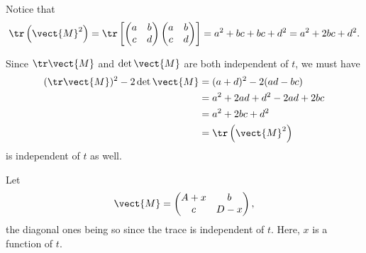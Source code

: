 \begin{enumerate}
          Notice that
          \[
              \tr \left(\vect{M}^2\right) = \tr \left[\begin{pmatrix}
                      a & b \\ c & d
                  \end{pmatrix}\begin{pmatrix}
                      a & b \\ c & d
                  \end{pmatrix}\right] = a^2 + bc + bc + d^2 = a^2 + 2bc + d^2.
          \]

          Since \(\tr \vect{M}\) and \(\det \vect{M}\) are both independent of \(t\), we must have
          \begin{align*}
              (\tr \vect{M})^2 - 2 \det \vect{M} & = (a + d)^2 - 2 (ad - bc)     \\
                                                 & = a^2 + 2ad + d^2 - 2ad + 2bc \\
                                                 & = a^2 + 2bc + d^2             \\
                                                 & = \tr \left(\vect{M}^2\right)
          \end{align*}
          is independent of \(t\) as well.

          Let
          \[
              \vect{M} = \begin{pmatrix}
                  A + x & b \\ c & D - x
              \end{pmatrix},
          \]
          the diagonal ones being so since the trace is independent of \(t\). Here, \(x\) is a function of \(t\).


\end{enumerate}
